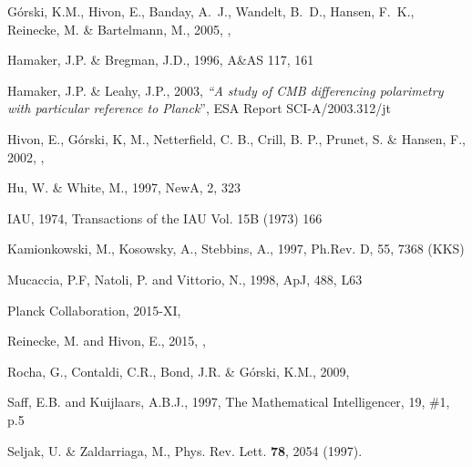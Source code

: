 \documentclass[12pt,twoside]{article}
\begin{document}
\begin{thebibliography}{99}
  G\'orski, K.M., Hivon, E., Banday, A.~J., Wandelt,
  B.~D., Hansen, F.~K., Reinecke, M. \& Bartelmann, M., 2005, 
, 

Hamaker, J.P. \& Bregman, J.D., 1996, A\&AS 117, 161

  Hamaker, J.P. \& Leahy, J.P., 2003, {\em ``A study of CMB differencing
  polarimetry with particular reference to {\em Planck}}'', {\sc ESA Report SCI-A/2003.312/jt}

Hivon, E., G{\'o}rski, K, M., Netterfield, C. B., Crill, B. P., Prunet, S. \& Hansen, F., 
2002, , 

Hu, W. \& White, M., 1997, NewA, 2, 323

IAU, 1974, Transactions of the IAU Vol. 15B (1973) 166

Kamionkowski, M., Kosowsky, A., Stebbins, A., 1997, Ph.Rev. D, 55, 7368 (KKS)

Mucaccia, P.F, Natoli, P. and Vittorio, N., 1998, ApJ, 488, L63

Planck Collaboration, 2015-XI, 

Reinecke, M. and Hivon, E., 2015, 
, 

Rocha, G., Contaldi, C.R., Bond, J.R. \& G\'orski, K.M., 2009,

Saff, E.B. and Kuijlaars, A.B.J., 1997, The Mathematical 
Intelligencer, 19, \#1, p.5

Seljak, U. \& Zaldarriaga, M., Phys. Rev. Lett. \textbf{78}, 2054 (1997).   


\end{thebibliography}
\end{document}
